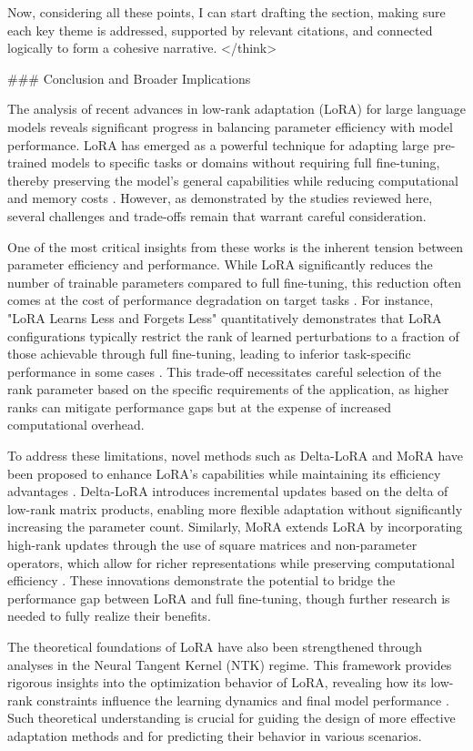 \documentclass[conference]{IEEEtran}
\begin{document}
Now, considering all these points, I can start drafting the section, making sure each key theme is addressed, supported by relevant citations, and connected logically to form a cohesive narrative.
</think>

### Conclusion and Broader Implications

The analysis of recent advances in low-rank adaptation (LoRA) for large language models reveals significant progress in balancing parameter efficiency with model performance. LoRA has emerged as a powerful technique for adapting large pre-trained models to specific tasks or domains without requiring full fine-tuning, thereby preserving the model's general capabilities while reducing computational and memory costs \cite{bX}. However, as demonstrated by the studies reviewed here, several challenges and trade-offs remain that warrant careful consideration.

One of the most critical insights from these works is the inherent tension between parameter efficiency and performance. While LoRA significantly reduces the number of trainable parameters compared to full fine-tuning, this reduction often comes at the cost of performance degradation on target tasks \cite{bX}. For instance, "LoRA Learns Less and Forgets Less" quantitatively demonstrates that LoRA configurations typically restrict the rank of learned perturbations to a fraction of those achievable through full fine-tuning, leading to inferior task-specific performance in some cases \cite{bX}. This trade-off necessitates careful selection of the rank parameter based on the specific requirements of the application, as higher ranks can mitigate performance gaps but at the expense of increased computational overhead.

To address these limitations, novel methods such as Delta-LoRA and MoRA have been proposed to enhance LoRA's capabilities while maintaining its efficiency advantages \cite{bX}. Delta-LoRA introduces incremental updates based on the delta of low-rank matrix products, enabling more flexible adaptation without significantly increasing the parameter count. Similarly, MoRA extends LoRA by incorporating high-rank updates through the use of square matrices and non-parameter operators, which allow for richer representations while preserving computational efficiency \cite{bX}. These innovations demonstrate the potential to bridge the performance gap between LoRA and full fine-tuning, though further research is needed to fully realize their benefits.

The theoretical foundations of LoRA have also been strengthened through analyses in the Neural Tangent Kernel (NTK) regime. This framework provides rigorous insights into the optimization behavior of LoRA, revealing how its low-rank constraints influence the learning dynamics and final model performance \cite{bX}. Such theoretical understanding is crucial for guiding the design of more effective adaptation methods and for predicting their behavior in various scenarios.
\end{document}
